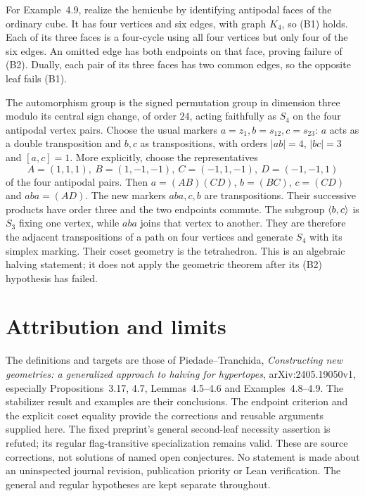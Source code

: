 For Example~4.9, realize the hemicube by identifying antipodal
faces of the ordinary cube. It has four vertices and six edges,
with graph $K_4$, so (B1) holds. Each of its three faces is a
four-cycle using all four vertices but only four of the six edges.
An omitted edge has both endpoints on that face, proving failure
of (B2). Dually, each pair of its three faces has two common edges,
so the opposite leaf fails (B1).

The automorphism group is the signed permutation group in dimension
three modulo its central sign change, of order $24$, acting faithfully
as $S_4$ on the four antipodal vertex pairs. Choose the usual markers
$a=z_1,b=s_{12},c=s_{23}$: $a$ acts as a double transposition and
$b,c$ as transpositions, with orders $|ab|=4$, $|bc|=3$ and
$[a,c]=1$. More explicitly, choose the representatives
\[
 A=(1,1,1),\ B=(1,-1,-1),\ C=(-1,1,-1),\ D=(-1,-1,1)
\]
of the four antipodal pairs. Then $a=(AB)(CD)$, $b=(BC)$,
$c=(CD)$ and $aba=(AD)$. The new markers $aba,c,b$ are transpositions. Their
successive products have order three and the two endpoints commute.
The subgroup $\langle b,c\rangle$ is $S_3$ fixing one vertex, while $aba$
joins that vertex to another. They are therefore the adjacent
transpositions of a path on four vertices and generate $S_4$ with
its simplex marking. Their coset geometry is the tetrahedron.
This is an algebraic halving statement; it does not apply the
geometric theorem after its (B2) hypothesis has failed.

\section{Attribution and limits}
The definitions and targets are those of Piedade--Tranchida,
\emph{Constructing new geometries: a generalized approach to halving
for hypertopes}, arXiv:2405.19050v1, especially Propositions~3.17,
4.7, Lemmas~4.5--4.6 and Examples~4.8--4.9. The stabilizer result
and examples are their conclusions. The endpoint criterion and
the explicit coset equality provide the corrections and reusable
arguments supplied here. The fixed preprint's general second-leaf
necessity assertion is refuted; its regular flag-transitive
specialization remains valid. These are source corrections, not
solutions of named open conjectures. No statement is made about
an uninspected journal revision, publication priority or Lean
verification. The general and regular hypotheses are kept separate throughout.
